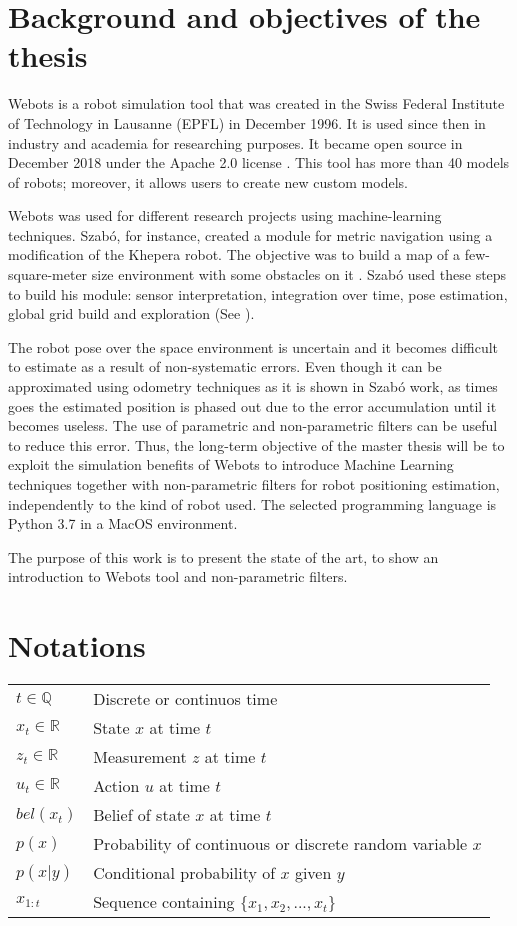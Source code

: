 \section{Background and objectives of the thesis}

Webots is a robot simulation tool that was created in the Swiss Federal Institute of Technology in Lausanne (EPFL) in December 1996. It is used since then in industry and academia for researching purposes. It became open source in December 2018 under the Apache 2.0 license \cite{cyberbotics}.  This tool has more than 40 models of robots; moreover, it allows users to create new custom models.


Webots was used for different research projects using machine-learning techniques. Szab\'{o}, for instance, created a module for metric navigation using a modification of the Khepera robot. The objective was to build a map of a few-square-meter size environment with some obstacles on it \cite{szabo}. Szab\'{o} used these steps to build his module: sensor interpretation, integration over time, pose estimation, global grid build and exploration (See \cite{thrun-1}).

The robot pose over the space environment is uncertain and it becomes difficult to estimate as a result of non-systematic errors. Even though it can be approximated using odometry techniques as it is shown in Szab\'{o} work, as times goes the estimated position is phased out due to the error accumulation until it becomes useless. The use of parametric and non-parametric filters can be useful to reduce this error. Thus, the long-term objective of the master thesis will be to exploit the simulation benefits of Webots to introduce Machine Learning techniques together with non-parametric filters for robot positioning estimation, independently to the kind of robot used. The selected programming language is Python 3.7 in a MacOS environment.

The purpose of this work is to present the state of the art, to show an introduction to Webots tool and non-parametric filters. 
\section{Notations}
\begin{flushleft}
\begin{tabular}{l l}
$t \in \mathbb{Q}$ & Discrete or continuos time\\
$x_t \in \mathbb{R}$ & State $x$ at time $t$\\
$z_t \in \mathbb{R}$  & Measurement $z$ at time $t$\\
$u_t \in \mathbb{R}$ & Action $u$ at time $t$\\
$bel(x_t)$ & Belief of state $x$ at time $t$\\
$p(x)$ & Probability of continuous or discrete random variable $x$\\
$p(x | y)$ & Conditional probability of $x$ given $y$\\
$x_{1:t}$ & Sequence containing $\{x_1, x_2, ..., x_t\}$\\ 
\end{tabular}
\end{flushleft}

